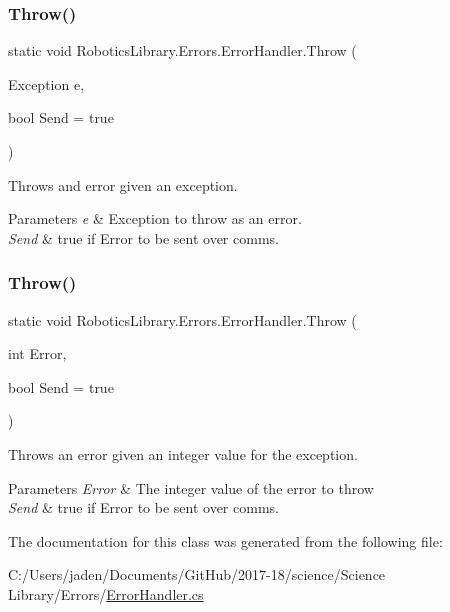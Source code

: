 \subsubsection{\texorpdfstring{Throw()}{Throw()}\hspace{0.1cm}{\footnotesize\ttfamily [1/2]}}
{\footnotesize\ttfamily static void Robotics\+Library.\+Errors.\+Error\+Handler.\+Throw (\begin{DoxyParamCaption}\item[{Exception}]{e,  }\item[{bool}]{Send = {\ttfamily true} }\end{DoxyParamCaption})\hspace{0.3cm}{\ttfamily [static]}}



Throws and error given an exception. 


\begin{DoxyParams}{Parameters}
{\em e} & Exception to throw as an error.\\
\hline
{\em Send} & true if Error to be sent over comms.\\
\hline
\end{DoxyParams}
\mbox{\label{class_robotics_library_1_1_errors_1_1_error_handler_a3d2861114cd4e8cc38cd8c5a8c539a0e}} 
\subsubsection{\texorpdfstring{Throw()}{Throw()}\hspace{0.1cm}{\footnotesize\ttfamily [2/2]}}
{\footnotesize\ttfamily static void Robotics\+Library.\+Errors.\+Error\+Handler.\+Throw (\begin{DoxyParamCaption}\item[{int}]{Error,  }\item[{bool}]{Send = {\ttfamily true} }\end{DoxyParamCaption})\hspace{0.3cm}{\ttfamily [static]}}



Throws an error given an integer value for the exception. 


\begin{DoxyParams}{Parameters}
{\em Error} & The integer value of the error to throw\\
\hline
{\em Send} & true if Error to be sent over comms.\\
\hline
\end{DoxyParams}


The documentation for this class was generated from the following file\+:\begin{DoxyCompactItemize}
\item 
C\+:/\+Users/jaden/\+Documents/\+Git\+Hub/2017-\/18/science/\+Science Library/\+Errors/\hyperlink{_error_handler_8cs}{Error\+Handler.\+cs}\end{DoxyCompactItemize}
